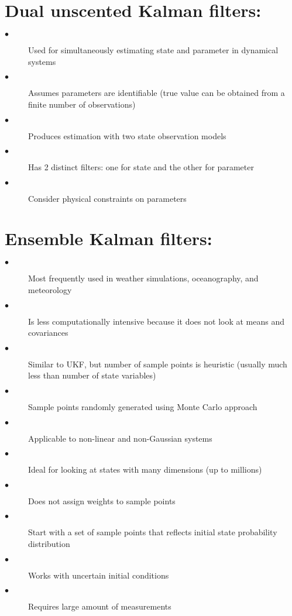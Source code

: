 \documentclass{article}
\begin{document}
\section{Dual unscented Kalman filters:}
\begin{description}
  \item[$\bullet$] Used for simultaneously estimating state and parameter in dynamical systems \cite{inbool, inproceedings, article5}
  \item[$\bullet$] Assumes parameters are identifiable (true value can be obtained from a finite number of observations) \cite{article5}
  \item[$\bullet$] Produces estimation with two state observation models \cite{inbook, inproceedings}
  \item[$\bullet$] Has 2 distinct filters: one for state and the other for parameter \cite{inbook, inproceedings}
  \item[$\bullet$] Consider physical constraints on parameters \cite{inbook}
\end{description} 




\section{Ensemble Kalman filters:}
\begin{description}
  \item[$\bullet$] Most frequently used in weather simulations, oceanography, and meteorology \cite{inproceedings2} 
  \item[$\bullet$] Is less computationally intensive because it does not look at means and covariances \cite{inproceedings2}
  \item[$\bullet$] Similar to UKF, but number of sample points is heuristic (usually much less than number of state variables)
  \cite{inproceedings3}
  \item[$\bullet$] Sample points randomly generated using Monte Carlo approach
  \item[$\bullet$] Applicable to non-linear and non-Gaussian systems
  \cite{inproceedings3}
  \item[$\bullet$] Ideal for looking at states with many dimensions (up to millions) \cite{inproceedings3}
  \item[$\bullet$] Does not assign weights to sample points \cite{inproceedings3}
  \item[$\bullet$] Start with a set of sample points that reflects initial state probability distribution
  \item[$\bullet$] Works with uncertain initial conditions
  \item[$\bullet$] Requires large amount of measurements
\end{description}
\end{document}
